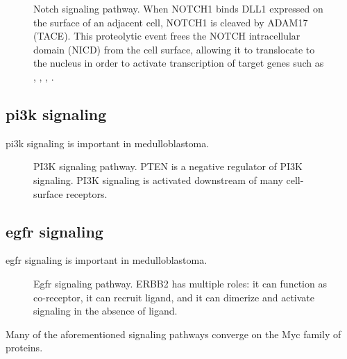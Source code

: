 \begin{figure}[H]
	\begin{center}
	\end{center}
	\caption[Notch signaling pathway]
	{
		Notch signaling pathway.
		When NOTCH1 binds DLL1 expressed on the surface of an adjacent cell, NOTCH1 is cleaved by ADAM17 (TACE). This proteolytic event frees the NOTCH intracellular domain (NICD) from the cell surface, allowing it to translocate to the nucleus in order to activate transcription of target genes such as , , , .
	}
	\label{fig:notch-pathway}
\end{figure}

\subsection{\gls{pi3k} signaling}

\gls{pi3k} signaling is important in medulloblastoma.

\begin{figure}[H]
	\begin{center}
	\end{center}
	\caption[PI3K signaling pathway]
	{
		PI3K signaling pathway.
		PTEN is a negative regulator of PI3K signaling. PI3K signaling is activated downstream of many cell-surface receptors.
	}
	\label{fig:pi3k-pathway}
\end{figure}


\subsection{\gls{egfr} signaling}

\gls{egfr} signaling is important in medulloblastoma.

\begin{figure}[H]
	\begin{center}
	\end{center}
	\caption[Egfr signaling pathway]
	{
		Egfr signaling pathway.
		ERBB2 has multiple roles: it can function as co-receptor, it can recruit ligand, and it can dimerize and activate signaling in the absence of ligand.
	}
	\label{fig:egfr-pathway}
\end{figure}


Many of the aforementioned signaling pathways converge on the Myc family of proteins.


